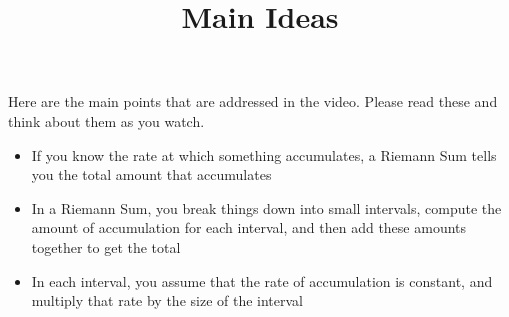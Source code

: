 \documentclass[handout]{ximera}
\title{Main Ideas}
\begin{document}
\begin{abstract}
\end{abstract}

\maketitle

Here are the main points that are addressed in the video. Please read these and think about them as you watch.

\begin{itemize}
\item If you know the rate at which something accumulates, a Riemann Sum tells you the total amount that accumulates
\item In a Riemann Sum, you break things down into small intervals, compute the amount of accumulation for each interval, and then add these amounts together to get the total
\item In each interval, you assume that the rate of accumulation is constant, and multiply that rate by the size of the interval
\end{itemize}
\end{document}

